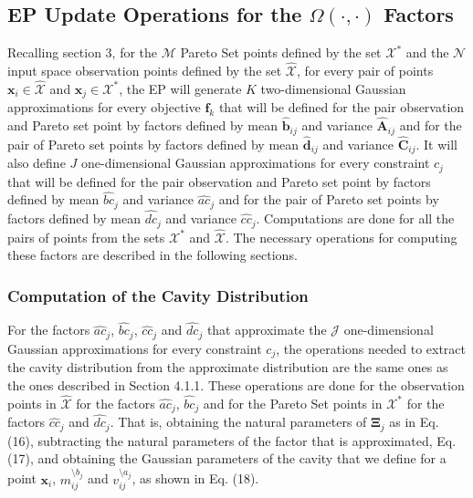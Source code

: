 \subsection{EP Update Operations for the $\Omega(\cdot,\cdot)$ Factors}

Recalling section 3, for the $\mathcal{M}$ Pareto Set points defined by the set $\mathcal{X}^*$ and the $\mathcal{N}$ input space observation points defined by the set $\hat{\mathcal{X}}$, for every pair of points $\boldsymbol{x}_i \in \hat{\mathcal{X}}$ and $\boldsymbol{x}_j \in \mathcal{X}^*$, the EP will generate $K$ two-dimensional Gaussian approximations for every objective $\boldsymbol{f}_k$ that will be defined for the pair observation and Pareto set point by factors defined by mean $\hat{\boldsymbol{b}}_{ij}$ and variance $\hat{\boldsymbol{A}}_{ij}$ and for the pair of Pareto set points by factors defined by mean $\hat{\boldsymbol{d}}_{ij}$ and variance $\hat{\boldsymbol{C}}_{ij}$. It will also define $J$ one-dimensional Gaussian approximations for every constraint $c_j$ that will be defined for the pair observation and Pareto set point by factors defined by mean $\hat{bc}_j$ and variance $\hat{ac}_j$ and for the pair of Pareto set points by factors defined by mean $\hat{dc}_j$ and variance $\hat{cc}_j$. Computations are done for all the pairs of points from the sets $\mathcal{X}^*$ and $\hat{\mathcal{X}}$. The necessary operations for computing these factors are described in the following sections.

\subsubsection{Computation of the Cavity Distribution}
For the factors $\hat{ac}_j$, $\hat{bc}_j$, $\hat{cc}_j$ and $\hat{dc}_j$ that approximate the $\mathcal{J}$ one-dimensional Gaussian approximations for every constraint $c_j$, the operations needed to extract the cavity distribution from the approximate distribution are the same ones as the ones described in Section 4.1.1. These operations are done for the observation points in $\hat{\mathcal{X}}$ for the factors $\hat{ac}_j$, $\hat{bc}_j$ and for the Pareto Set points in $\mathcal{X}^*$ for the factors $\hat{cc}_j$ and $\hat{dc}_j$. That is, obtaining the natural parameters of $\boldsymbol{\Xi}_j$ as in Eq. (16), subtracting the natural parameters of the factor that is approximated, Eq. (17), and obtaining the Gaussian parameters of the cavity that we define for a point $\boldsymbol{x}_i$, $m_{ij}^{\setminus b_j}$ and $v_{ij}^{\setminus a_j}$, as shown in Eq. (18).

